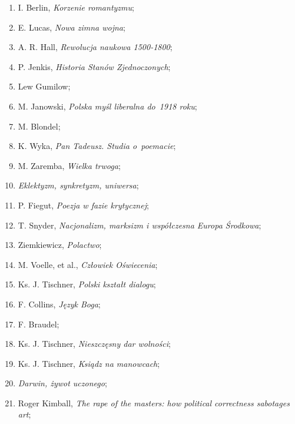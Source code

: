 \documentclass[a4paper,11pt]{article}
\begin{document}
\begin{enumerate}
\item I. Berlin, \emph{Korzenie romantyzmu};

\item E. Lucas, \emph{Nowa zimna wojna};

\item A. R. Hall, \emph{Rewolucja naukowa 1500-1800};

\item P. Jenkis, \emph{Historia Stanów Zjednoczonych};

\item Lew Gumilow;

\item M. Janowski, \emph{Polska myśl liberalna do~1918 roku};

\item M. Blondel;

\item K. Wyka, \emph{Pan Tadeusz. Studia o~poemacie};

\item M. Zaremba, \emph{Wielka trwoga};

\item \emph{Eklektyzm, synkretyzm, uniwersa};

\item P. Fiegut, \emph{Poezja w fazie krytycznej};

\item T. Snyder, \emph{Nacjonalizm, marksizm i współczesna Europa
    Środkowa};

\item Ziemkiewicz, \emph{Polactwo};

\item M. Voelle, et al., \emph{Człowiek Oświecenia};

\item Ks. J. Tischner, \emph{Polski kształt dialogu};

\item F. Collins, \emph{Język Boga};

\item F. Braudel;

\item Ks. J. Tischner, \emph{Nieszczęsny dar wolności};

\item Ks. J. Tischner, \emph{Ksiądz na manowcach};

\item \emph{Darwin, żywot uczonego};

\item Roger Kimball, \emph{The rape of the masters: how political
    correctness sabotages art};


\end{enumerate}
\end{document}
